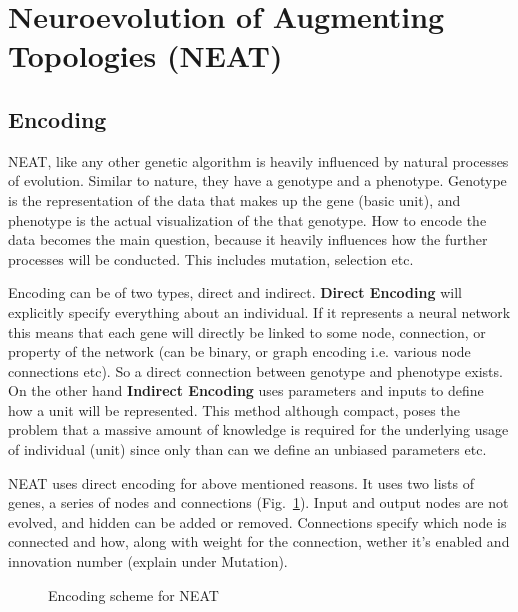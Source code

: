 \documentclass[conference]{IEEEtran}
\begin{document}
\section{Neuroevolution of Augmenting Topologies (NEAT)}

\subsection{Encoding}
NEAT, like any other genetic algorithm is heavily influenced by natural processes of evolution. Similar to nature, they have a genotype and a phenotype. Genotype is the representation of the data that makes up the gene (basic unit), and phenotype is the actual visualization of the that genotype. How to encode the data becomes the main question, because it heavily influences how the further processes will be conducted. This includes mutation, selection etc.

Encoding can be of two types, direct and indirect. \textbf{Direct Encoding} will explicitly specify everything about an individual. If it represents a neural network this means that each gene will directly be linked to some node, connection, or property of the network (can be binary, or graph encoding i.e. various node connections etc). So a direct connection between genotype and phenotype exists. On the other hand \textbf{Indirect Encoding} uses parameters and inputs to define how a unit will be represented. This method although compact, poses the problem that a massive amount of knowledge is required for the underlying usage of individual (unit) since only than can we define an unbiased parameters etc.

NEAT uses direct encoding for above mentioned reasons. It uses two lists of genes, a series of nodes and connections (Fig.~\ref{fig1}). Input and output nodes are not evolved, and hidden can be added or removed. Connections specify which node is connected and how, along with weight for the connection, wether it's enabled and innovation number (explain under Mutation).

\begin{figure}[htbp]
\caption{Encoding scheme for NEAT}
\label{fig1}
\end{figure}
\end{document}
